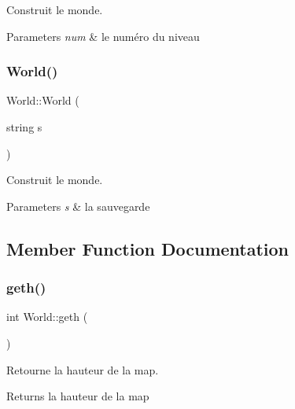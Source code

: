 Construit le monde. 


\begin{DoxyParams}{Parameters}
{\em num} & le numéro du niveau \\
\hline
\end{DoxyParams}
\mbox{\label{classWorld_a355ad01d1b25fb78d93778265169ec83}} 
\subsubsection{\texorpdfstring{World()}{World()}\hspace{0.1cm}{\footnotesize\ttfamily [2/2]}}
{\footnotesize\ttfamily World\+::\+World (\begin{DoxyParamCaption}\item[{string}]{s }\end{DoxyParamCaption})}



Construit le monde. 


\begin{DoxyParams}{Parameters}
{\em s} & la sauvegarde \\
\hline
\end{DoxyParams}


\subsection{Member Function Documentation}
\mbox{\label{classWorld_a641eb75c81ff846ac12104941cb2b284}} 
\subsubsection{\texorpdfstring{geth()}{geth()}}
{\footnotesize\ttfamily int World\+::geth (\begin{DoxyParamCaption}{ }\end{DoxyParamCaption})}



Retourne la hauteur de la map. 

\begin{DoxyReturn}{Returns}
la hauteur de la map 
\end{DoxyReturn}
\mbox{\label{classWorld_a319ec8ce8b40a73bfba442a69c3bf621}} 
